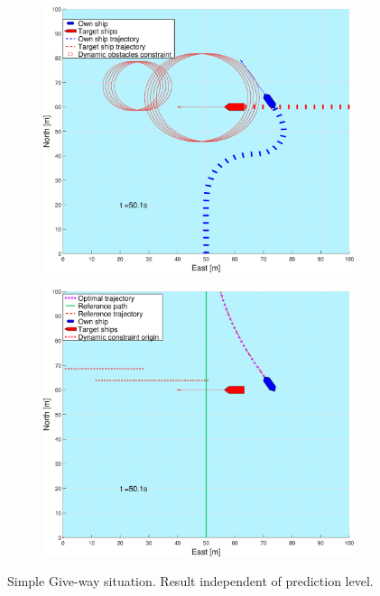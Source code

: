 \begin{figure}[ht!]
\begin{subfigure}[b]{0.499\textwidth}
        \subcaption{}
    \end{subfigure}
    \hfill
    \\
    \begin{subfigure}[b]{0.49\textwidth}
        \centering
        \includegraphics[width=\textwidth]{Images/Figures/enkel_GW/_Simple_0fig1_time=50}
        \subcaption{}
    \end{subfigure}
    \hfill
    \begin{subfigure}[b]{0.499\textwidth}
        \centering
        \includegraphics[width=\textwidth]{Images/Figures/enkel_GW/_Simple_0fig999_time=50}
        \subcaption{}
    \end{subfigure}
    \hfill
    \caption{Simple Give-way situation. Result independent of prediction level.}
    \label{FIG: simple GW}
\end{figure}%
